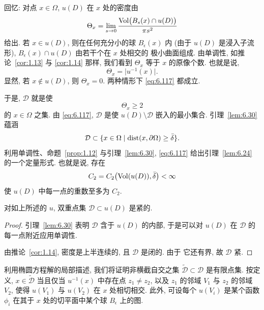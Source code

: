 回忆: 对点 $x\in\Omega$, $u(D)$ 在 $x$ 处的密度由
\begin{equation}
\Theta_x=\lim_{s\to0}
\frac{\operatorname{Vol}\bigl(B_s(x)\cap u(D)\bigr)}{\pi s^2}
\label{eq:6.116}
\end{equation}
给出. 若 $x\in u(D)$, 则在任何充分小的球 $B_\epsilon(x)$ 内 (由于
$u(D)$ 是浸入子流形), $B_\epsilon(x)\cap u(D)$ 由若干个在 $x$ 处相交的
极小曲面组成. 由单调性, 如推论~\ref{cor:1.13} 与 \ref{cor:1.14} 那样,
我们看到 $\Theta_x$ 等于 $x$ 的原像个数. 也就是说,
\begin{equation}
\Theta_x=\bigl|u^{-1}(x)\bigr|.
\label{eq:6.117}
\end{equation}
显然, 若 $x\notin u(D)$, 则 $\Theta_x=0$. 两种情形下 \eqref{eq:6.117}
都成立.

于是,  $\mathcal{D}$ 就是使
\begin{equation}
\Theta_x\geq2
\label{eq:6.118}
\end{equation}
的 $x\in\Omega$ 之集. 由 \eqref{eq:6.117}, $\mathcal{D}$ 是使
$u(D)\setminus\mathcal{D}$ 嵌入的最小集合. 引理~\ref{lem:6.30} 蕴涵
\begin{equation}
\mathcal{D}\subset
\{x\in\Omega\mid\operatorname{dist}(x,\partial\Omega)\geq\bar{\delta}\}.
\label{eq:6.119}
\end{equation}
利用单调性、命题~\ref{prop:1.12} 与引理~\ref{lem:6.30},
\eqref{eq:6.117} 给出引理~\ref{lem:6.24} 的一个定量形式. 也就是说,
存在
\begin{equation}
C_2=C_2\bigl(\operatorname{Vol}(u(D)),\bar{\delta}\bigr)<\infty
\label{eq:6.120}
\end{equation}
使 $u(D)$ 中每一点的重数至多为 $C_2$.

\begin{lemma}
\label{lem:6.31}
对如上所述的 $u$, 双重点集 $\mathcal{D}\subset u(D)$ 是紧的.
\end{lemma}

\begin{proof}
引理~\ref{lem:6.30} 表明 $\mathcal{D}$ 含于 $u(D)$ 的内部, 于是可以对
$u(D)$ 在 $\mathcal{D}$ 的每一点附近应用单调性.

由推论~\ref{cor:1.14}, 密度是上半连续的, 且 $\mathcal{D}$ 是闭的. 由于
它还有界, 故 $\mathcal{D}$ 紧.
\end{proof}

利用椭圆方程解的局部描述, 我们将证明非横截自交之集
$\tilde{\mathcal{D}}\subset\mathcal{D}$ 是有限点集. 按定义,
$x\in\tilde{\mathcal{D}}$ 当且仅当 $u^{-1}(x)$ 中存在点 $z_1\neq z_2$,
以及 $z_1$ 的邻域 $V_1$ 与 $z_2$ 的邻域 $V_2$, 使得 $u(V_1)$ 与
$u(V_2)$ 在 $x$ 处相切相交. 此外, 可设每个 $u(V_i)$ 是某个函数
$\phi_i$ 在其于 $x$ 处的切平面中某个球 $B_\epsilon$ 上的图.

